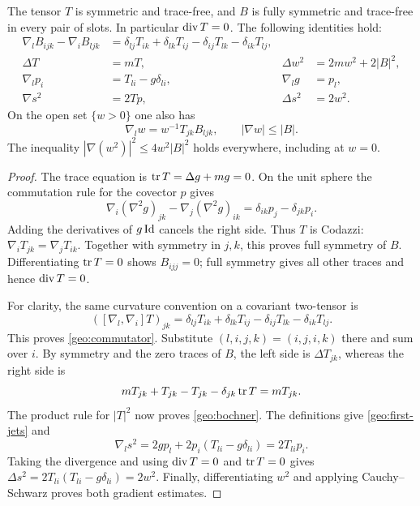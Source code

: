 \begin{proposition}\label{geo:interior-identities}
The tensor $T$ is symmetric and trace-free, and $B$ is fully symmetric
and trace-free in every pair of slots. In particular $\operatorname{div} T=0$.
The following identities hold:
\begin{align}
 \nabla_lB_{ijk}-\nabla_iB_{ljk}
 &=\delta_{lj}T_{ik}+\delta_{lk}T_{ij}
   -\delta_{ij}T_{lk}-\delta_{ik}T_{lj},
 \label{geo:commutator}\\
 \Delta T&=mT,
 &\Delta w^2&=2m w^2+2|B|^2,
 \label{geo:bochner}\\
 \nabla_l p_i&=T_{li}-g\delta_{li},
 &\nabla_l g&=p_l,
 \label{geo:first-jets}\\
 \nabla s^2&=2Tp,
 &\Delta s^2&=2w^2.
 \label{geo:s-identities}
\end{align}
On the open set $\{w>0\}$ one also has
\begin{equation}\label{geo:w-gradient}
 \nabla_l w=w^{-1}T_{jk}B_{ljk},\qquad |\nabla w|\le |B|.
\end{equation}
The inequality
$|\nabla(w^2)|^2\le4w^2|B|^2$ holds everywhere, including at $w=0$.
\end{proposition}

\begin{proof}
The trace equation is $\operatorname{tr} T=\Delta g+mg=0$.
On the unit sphere the commutation rule for the covector $p$ gives
\[
 \nabla_i(\nabla^2g)_{jk}-\nabla_j(\nabla^2g)_{ik}
 =\delta_{ik}p_j-\delta_{jk}p_i.
\]
Adding the derivatives of $g\operatorname{Id}$ cancels the right side. Thus $T$ is
Codazzi: $\nabla_iT_{jk}=\nabla_jT_{ik}$.
Together with symmetry in $j,k$, this proves full symmetry of $B$.
Differentiating $\operatorname{tr} T=0$ shows $B_{ijj}=0$; full symmetry gives all
other traces and hence $\operatorname{div} T=0$.

For clarity, the same curvature convention on a covariant two-tensor is
\[
 ([\nabla_l,\nabla_i]T)_{jk}
 =\delta_{lj}T_{ik}+\delta_{lk}T_{ij}
  -\delta_{ij}T_{lk}-\delta_{ik}T_{lj}.
\]
This proves \eqref{geo:commutator}. Substitute $(l,i,j,k)=(i,j,i,k)$
there and sum over $i$. By symmetry and the zero traces of $B$, the
left side is $\Delta T_{jk}$, whereas the right side is
\[
 mT_{jk}+T_{jk}-T_{jk}-\delta_{jk}\operatorname{tr} T=mT_{jk}.
\]
The product rule for $|T|^2$ now proves \eqref{geo:bochner}.
The definitions give \eqref{geo:first-jets} and
\[
 \nabla_l s^2=2gp_l+2p_i(T_{li}-g\delta_{li})=2T_{li}p_i.
\]
Taking the divergence and using $\operatorname{div} T=0$ and $\operatorname{tr} T=0$ gives
$\Delta s^2=2T_{li}(T_{li}-g\delta_{li})=2w^2$.
Finally, differentiating $w^2$ and applying Cauchy--Schwarz proves
both gradient estimates.
\end{proof}

